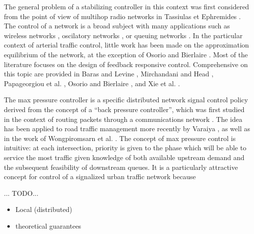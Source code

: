 The general problem of a stabilizing controller in this context was first considered from the point of view of multihop radio networks in Tassiulas et Ephremides \cite{MaxPressureOriginal}. The control of a network is a broad subject with many applications such as wireless networks \cite{StabRelayNetworks}\cite{ControlWireless}, oscilatory networks \cite{SynchroComplexNetworks}, or queuing networks \cite{MultiQueues}\cite{CDC03OptSwitch}. In the particular context of arterial traffic control, little work has been made on the approximation equilibrium of the network, at the exception of Osorio and Bierlaire \cite{ModelSignalOpt}\cite{ModelFiniteNetwork}. Most of the literature focuses on the design of feedback responsive control. Comprehensive on this topic are provided in
Baras and Levine \cite{NetworkBarasOne}\cite{NetworkBarasTwo}, Mirchandani and Head \cite{Mirchandani}, Papageorgiou et al. \cite{Papageorgiou}, Osorio and Bierlaire \cite{ModelSignalOpt}, and Xie et al. \cite{Xie}.

The max pressure controller is a specific distributed network signal control policy derived from the concept of a ``back pressure controller'', which was first studied in the context of routing packets through a communications network \cite{MaxPressureOriginal}. The idea has been applied to road traffic management more recently by Varaiya \cite{MaxPressureStochastic}, as well as in the work of Wongpiromsarn et al. \cite{MaxPressureStochasticConcurrent}. The concept of max pressure control is intuitive: at each intersection, priority is given to the phase which will be able to service the most traffic given knowledge of both available upstream demand and the subsequent feasibility of downstream queues. It is a particularly attractive concept for control of a signalized urban traffic network because {\color{red} ... TODO... 
\begin{itemize}
\item Local (distributed)
\item theoretical guarantees
\end{itemize}
}

